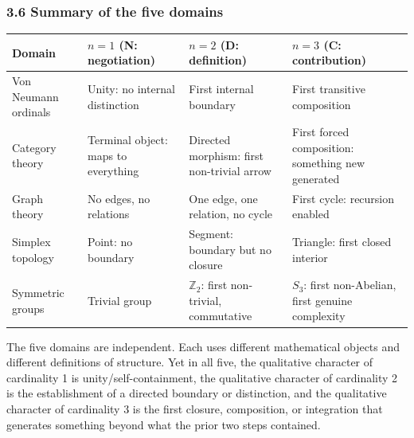 \documentclass[
  11pt,
  letterpaper,
]{article}
\begin{document}
\subsubsection{3.6 Summary of the five
domains}\label{summary-of-the-five-domains}

\begin{longtable}[]{@{}
  >{\raggedright\arraybackslash}p{}
  >{\raggedright\arraybackslash}p{}
  >{\raggedright\arraybackslash}p{}
  >{\raggedright\arraybackslash}p{}@{}}
\toprule\noalign{}
\begin{minipage}[b]{\linewidth}\raggedright
Domain
\end{minipage} & \begin{minipage}[b]{\linewidth}\raggedright
\(n = 1\) (N: negotiation)
\end{minipage} & \begin{minipage}[b]{\linewidth}\raggedright
\(n = 2\) (D: definition)
\end{minipage} & \begin{minipage}[b]{\linewidth}\raggedright
\(n = 3\) (C: contribution)
\end{minipage} \\
\midrule\noalign{}
\endhead
\bottomrule\noalign{}
\endlastfoot
Von Neumann ordinals & Unity: no internal distinction & First internal
boundary & First transitive composition \\
Category theory & Terminal object: maps to everything & Directed
morphism: first non-trivial arrow & First forced composition: something
new generated \\
Graph theory & No edges, no relations & One edge, one relation, no cycle
& First cycle: recursion enabled \\
Simplex topology & Point: no boundary & Segment: boundary but no closure
& Triangle: first closed interior \\
Symmetric groups & Trivial group & \(\mathbb{Z}_2\): first non-trivial,
commutative & \(S_3\): first non-Abelian, first genuine complexity \\
\end{longtable}

The five domains are independent. Each uses different mathematical
objects and different definitions of structure. Yet in all five, the
qualitative character of cardinality 1 is unity/self-containment, the
qualitative character of cardinality 2 is the establishment of a
directed boundary or distinction, and the qualitative character of
cardinality 3 is the first closure, composition, or integration that
generates something beyond what the prior two steps contained.
\end{document}
